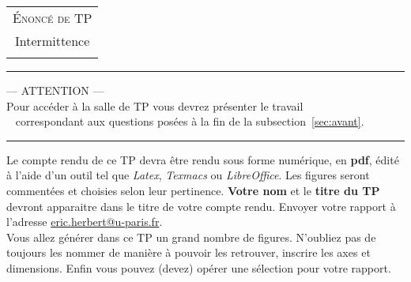 \documentclass[12pt,a4,french]{article}
\begin{document}
	
	
	
	\chead{}
	
	
\begin{center}
    \begin{tabular}{c}
        {\Large  \textsc{Énoncé de TP}}\\
        {\Large{Intermittence}}\\
        \\
    \end{tabular}
    
    \normalsize 
    
    \hrule
    \vspace{0.5cm}
    
    --- ATTENTION ---\\
    Pour accéder à la salle de TP vous devrez présenter le travail \\ 
    correspondant aux questions posées à la fin de la subsection~\ref{sec:avant}.
    
    \vspace{0.5cm}
    \hrule
\end{center}



Le compte rendu de ce TP devra être rendu sous forme numérique, en \textbf{pdf},
édité à l'aide d'un outil tel que \textit{Latex}, \textit{Texmacs} ou \textit{LibreOffice}. Les figures seront
commentées et choisies selon leur pertinence.
\textbf{Votre nom} et le \textbf{titre du TP}  devront apparaitre dans le titre de votre compte rendu.
Envoyer votre rapport à l'adresse  \href{mailto:eric.herbert@u-paris.fr}{eric.herbert@u-paris.fr}. \\
Vous allez générer dans ce TP un grand nombre de figures. N'oubliez pas de toujours les nommer de manière à pouvoir les retrouver, inscrire les axes et dimensions. Enfin vous pouvez (devez) opérer une sélection pour votre rapport. 
\end{document}

